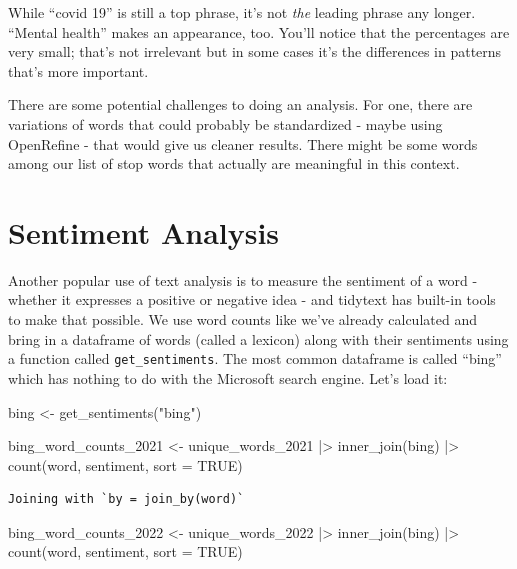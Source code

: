 \documentclass[
  letterpaper,
  DIV=11,
  numbers=noendperiod]{scrreprt}
\newenvironment{Shaded}{\begin{snugshade}}{\end{snugshade}}
\newcommand{\AttributeTok}[1]{\textcolor[rgb]{0.40,0.45,0.13}{#1}}
\newcommand{\ConstantTok}[1]{\textcolor[rgb]{0.56,0.35,0.01}{#1}}
\newcommand{\FunctionTok}[1]{\textcolor[rgb]{0.28,0.35,0.67}{#1}}
\newcommand{\NormalTok}[1]{\textcolor[rgb]{0.00,0.23,0.31}{#1}}
\newcommand{\OtherTok}[1]{\textcolor[rgb]{0.00,0.23,0.31}{#1}}
\newcommand{\SpecialCharTok}[1]{\textcolor[rgb]{0.37,0.37,0.37}{#1}}
\newcommand{\StringTok}[1]{\textcolor[rgb]{0.13,0.47,0.30}{#1}}
\begin{document}
While ``covid 19'' is still a top phrase, it's not \emph{the} leading
phrase any longer. ``Mental health'' makes an appearance, too. You'll
notice that the percentages are very small; that's not irrelevant but in
some cases it's the differences in patterns that's more important.

There are some potential challenges to doing an analysis. For one, there
are variations of words that could probably be standardized - maybe
using OpenRefine - that would give us cleaner results. There might be
some words among our list of stop words that actually are meaningful in
this context.

\hypertarget{sentiment-analysis}{%
\section{Sentiment Analysis}\label{sentiment-analysis}}

Another popular use of text analysis is to measure the sentiment of a
word - whether it expresses a positive or negative idea - and tidytext
has built-in tools to make that possible. We use word counts like we've
already calculated and bring in a dataframe of words (called a lexicon)
along with their sentiments using a function called
\texttt{get\_sentiments}. The most common dataframe is called ``bing''
which has nothing to do with the Microsoft search engine. Let's load it:

\begin{Shaded}
\begin{Highlighting}[]
\NormalTok{bing }\OtherTok{\textless{}{-}} \FunctionTok{get\_sentiments}\NormalTok{(}\StringTok{"bing"}\NormalTok{)}

\NormalTok{bing\_word\_counts\_2021 }\OtherTok{\textless{}{-}}\NormalTok{ unique\_words\_2021 }\SpecialCharTok{|\textgreater{}}
  \FunctionTok{inner\_join}\NormalTok{(bing) }\SpecialCharTok{|\textgreater{}}
  \FunctionTok{count}\NormalTok{(word, sentiment, }\AttributeTok{sort =} \ConstantTok{TRUE}\NormalTok{)}
\end{Highlighting}
\end{Shaded}

\begin{verbatim}
Joining with `by = join_by(word)`
\end{verbatim}

\begin{Shaded}
\begin{Highlighting}[]
\NormalTok{bing\_word\_counts\_2022 }\OtherTok{\textless{}{-}}\NormalTok{ unique\_words\_2022 }\SpecialCharTok{|\textgreater{}}
  \FunctionTok{inner\_join}\NormalTok{(bing) }\SpecialCharTok{|\textgreater{}}
  \FunctionTok{count}\NormalTok{(word, sentiment, }\AttributeTok{sort =} \ConstantTok{TRUE}\NormalTok{)}
\end{Highlighting}
\end{Shaded}
\end{document}
